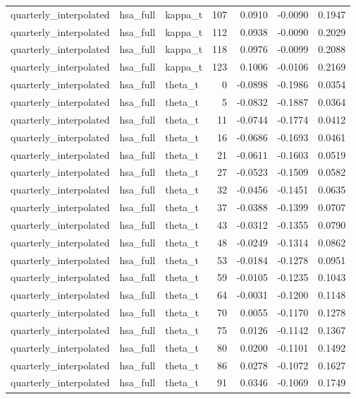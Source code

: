 \begin{tabular}{lllrrrr}
quarterly\_interpolated & hsa\_full & kappa\_t & 107 & 0.0910 & -0.0090 & 0.1947 \\
quarterly\_interpolated & hsa\_full & kappa\_t & 112 & 0.0938 & -0.0090 & 0.2029 \\
quarterly\_interpolated & hsa\_full & kappa\_t & 118 & 0.0976 & -0.0099 & 0.2088 \\
quarterly\_interpolated & hsa\_full & kappa\_t & 123 & 0.1006 & -0.0106 & 0.2169 \\
quarterly\_interpolated & hsa\_full & theta\_t & 0 & -0.0898 & -0.1986 & 0.0354 \\
quarterly\_interpolated & hsa\_full & theta\_t & 5 & -0.0832 & -0.1887 & 0.0364 \\
quarterly\_interpolated & hsa\_full & theta\_t & 11 & -0.0744 & -0.1774 & 0.0412 \\
quarterly\_interpolated & hsa\_full & theta\_t & 16 & -0.0686 & -0.1693 & 0.0461 \\
quarterly\_interpolated & hsa\_full & theta\_t & 21 & -0.0611 & -0.1603 & 0.0519 \\
quarterly\_interpolated & hsa\_full & theta\_t & 27 & -0.0523 & -0.1509 & 0.0582 \\
quarterly\_interpolated & hsa\_full & theta\_t & 32 & -0.0456 & -0.1451 & 0.0635 \\
quarterly\_interpolated & hsa\_full & theta\_t & 37 & -0.0388 & -0.1399 & 0.0707 \\
quarterly\_interpolated & hsa\_full & theta\_t & 43 & -0.0312 & -0.1355 & 0.0790 \\
quarterly\_interpolated & hsa\_full & theta\_t & 48 & -0.0249 & -0.1314 & 0.0862 \\
quarterly\_interpolated & hsa\_full & theta\_t & 53 & -0.0184 & -0.1278 & 0.0951 \\
quarterly\_interpolated & hsa\_full & theta\_t & 59 & -0.0105 & -0.1235 & 0.1043 \\
quarterly\_interpolated & hsa\_full & theta\_t & 64 & -0.0031 & -0.1200 & 0.1148 \\
quarterly\_interpolated & hsa\_full & theta\_t & 70 & 0.0055 & -0.1170 & 0.1278 \\
quarterly\_interpolated & hsa\_full & theta\_t & 75 & 0.0126 & -0.1142 & 0.1367 \\
quarterly\_interpolated & hsa\_full & theta\_t & 80 & 0.0200 & -0.1101 & 0.1492 \\
quarterly\_interpolated & hsa\_full & theta\_t & 86 & 0.0278 & -0.1072 & 0.1627 \\
quarterly\_interpolated & hsa\_full & theta\_t & 91 & 0.0346 & -0.1069 & 0.1749 \\

\end{tabular}
